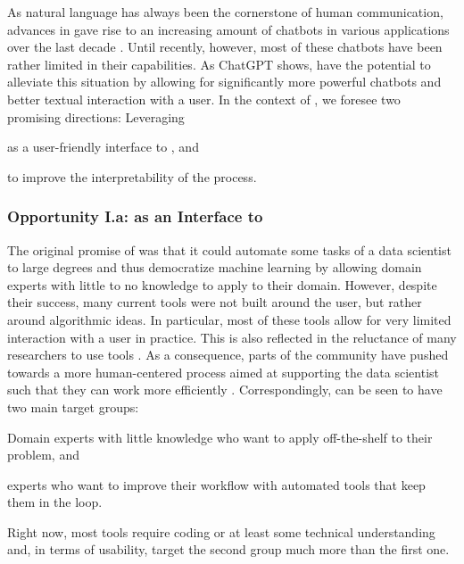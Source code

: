\documentclass[10pt]{article} %
\begin{document}
As natural language has always been the cornerstone of human communication, advances in \NLP gave rise to an increasing amount of chatbots in various applications over the last decade \citep{adamopoulou-mla20}. Until recently, however, most of these chatbots have been rather limited in their capabilities. As ChatGPT \citep{openai-openai22a} shows, \LLMs have the potential to alleviate this situation by allowing for significantly more powerful chatbots and better textual interaction with a user. In the context of \AutoML, we foresee two promising directions: Leveraging \LLMs
\begin{inparaenum}[(i)]
    \item as a user-friendly interface to \AutoML, and
    \item to improve the interpretability of the \AutoML process.
\end{inparaenum}


\subsubsection{Opportunity I.a:  \LLMs as an Interface to \AutoML}
\label{subsec:llms-as-interface-to-automl}

The original promise of \AutoML was that it could automate some tasks of a data scientist to large degrees and thus democratize machine learning by allowing domain experts with little to no \ML knowledge to apply \ML to their domain. However, despite their success, many current \AutoML tools were not built around the user, but rather around algorithmic ideas. In particular, most of these tools allow for very limited interaction with a user in practice. This is also reflected in the reluctance of many researchers to use \AutoML tools \citep{blom-automl21a}. As a consequence, parts of the community have pushed towards a more human-centered \AutoML process aimed at supporting the data scientist such that they can work more efficiently \citep{lindauer-automlorg22,pfisterer-arxiv2019a}. Correspondingly, \AutoML can be seen to have two main target groups: 
\begin{inparaenum}[(i)]
    \item Domain experts with little \ML knowledge who want to apply off-the-shelf \ML to their problem, and
    \item \ML experts who want to improve their workflow with automated tools that keep them in the loop. 
\end{inparaenum}
%
Right now, most \AutoML tools require coding or at least some technical understanding and, in terms of usability, target the second group much more than the first one. 
\end{document}
